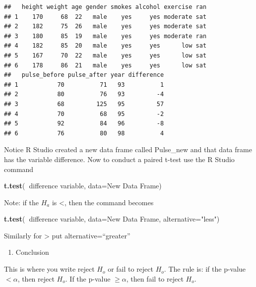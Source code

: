 \documentclass[
]{book}
\newenvironment{Shaded}{\begin{snugshade}}{\end{snugshade}}
\newcommand{\DataTypeTok}[1]{\textcolor[rgb]{0.13,0.29,0.53}{#1}}
\newcommand{\KeywordTok}[1]{\textcolor[rgb]{0.13,0.29,0.53}{\textbf{#1}}}
\newcommand{\NormalTok}[1]{#1}
\newcommand{\OperatorTok}[1]{\textcolor[rgb]{0.81,0.36,0.00}{\textbf{#1}}}
\newcommand{\StringTok}[1]{\textcolor[rgb]{0.31,0.60,0.02}{#1}}
\providecommand{\tightlist}{%
  \setlength{\itemsep}{0pt}\setlength{\parskip}{0pt}}
\begin{document}
\begin{verbatim}
##   height weight age gender smokes alcohol exercise ran
## 1    170     68  22   male    yes     yes moderate sat
## 2    182     75  26   male    yes     yes moderate sat
## 3    180     85  19   male    yes     yes moderate ran
## 4    182     85  20   male    yes     yes      low sat
## 5    167     70  22   male    yes     yes      low sat
## 6    178     86  21   male    yes     yes      low sat
##   pulse_before pulse_after year difference
## 1           70          71   93          1
## 2           80          76   93         -4
## 3           68         125   95         57
## 4           70          68   95         -2
## 5           92          84   96         -8
## 6           76          80   98          4
\end{verbatim}

Notice R Studio created a new data frame called Pulse\_new and that data frame has the variable difference.
Now to conduct a paired t-test use the R Studio command

\begin{Shaded}
\begin{Highlighting}[]
\KeywordTok{t.test}\NormalTok{(}\OperatorTok{~}\NormalTok{difference variable, }\DataTypeTok{data=}\NormalTok{New Data Frame)}
\end{Highlighting}
\end{Shaded}

Note: if the \(H_a\) is \textless, then the command becomes

\begin{Shaded}
\begin{Highlighting}[]
\KeywordTok{t.test}\NormalTok{(}\OperatorTok{~}\NormalTok{difference variable, }\DataTypeTok{data=}\NormalTok{New Data Frame, }\DataTypeTok{alternative=}\StringTok{"less"}\NormalTok{)}
\end{Highlighting}
\end{Shaded}

Similarly for \textgreater{} put alternative=``greater''

\begin{enumerate}
\def\labelenumi{\arabic{enumi}.}
\setcounter{enumi}{4}
\tightlist
\item
  Conclusion
\end{enumerate}

This is where you write reject \(H_o\) or fail to reject \(H_o\). The rule is: if the p-value \(<\alpha\), then reject \(H_o\). If the p-value \(\ge\alpha\), then fail to reject \(H_o\).
\end{document}
